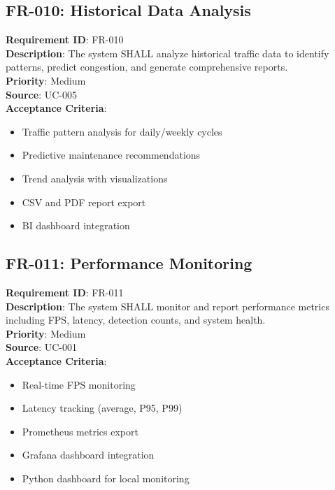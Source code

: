 \documentclass[12pt,a4paper]{article}
\begin{document}
\subsection{FR-010: Historical Data Analysis}
\textbf{Requirement ID}: FR-010 \\
\textbf{Description}: The system SHALL analyze historical traffic data to identify patterns, predict congestion, and generate comprehensive reports. \\
\textbf{Priority}: Medium \\
\textbf{Source}: UC-005 \\
\textbf{Acceptance Criteria}:
\begin{itemize}
    \item Traffic pattern analysis for daily/weekly cycles
    \item Predictive maintenance recommendations
    \item Trend analysis with visualizations
    \item CSV and PDF report export
    \item BI dashboard integration
\end{itemize}

\subsection{FR-011: Performance Monitoring}
\textbf{Requirement ID}: FR-011 \\
\textbf{Description}: The system SHALL monitor and report performance metrics including FPS, latency, detection counts, and system health. \\
\textbf{Priority}: Medium \\
\textbf{Source}: UC-001 \\
\textbf{Acceptance Criteria}:
\begin{itemize}
    \item Real-time FPS monitoring
    \item Latency tracking (average, P95, P99)
    \item Prometheus metrics export
    \item Grafana dashboard integration
    \item Python dashboard for local monitoring
\end{itemize}
\end{document}
